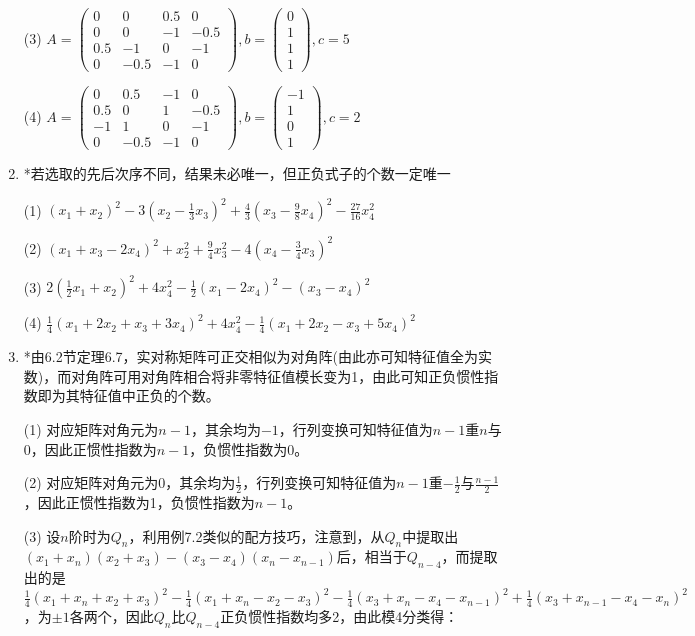 \documentclass[a4paper,UTF8,fontset=windows]{ctexart}
\begin{document}
\begin{enumerate}
(3) $A=\begin{pmatrix}0&0&0.5&0\\0&0&-1&-0.5\\0.5&-1&0&-1\\0&-0.5&-1&0\end{pmatrix},b=\begin{pmatrix}0\\1\\1\\1\end{pmatrix},c=5$

(4) $A=\begin{pmatrix}0&0.5&-1&0\\0.5&0&1&-0.5\\-1&1&0&-1\\0&-0.5&-1&0\end{pmatrix},b=\begin{pmatrix}-1\\1\\0\\1\end{pmatrix},c=2$

\item
*若选取的先后次序不同，结果未必唯一，但正负式子的个数一定唯一

(1) $(x_1+x_2)^2-3\left(x_2-\frac{1}{3}x_3\right)^2+\frac{4}{3}\left(x_3-\frac{9}{8}x_4\right)^2-\frac{27}{16}x_4^2$

(2) $(x_1+x_3-2x_4)^2+x_2^2+\frac{9}{4}x_3^2-4\left(x_4-\frac{3}{4}x_3\right)^2$

(3) $2\left(\frac{1}{2}x_1+x_2\right)^2+4x_4^2-\frac{1}{2}(x_1-2x_4)^2-(x_3-x_4)^2$

(4) $\frac{1}{4}(x_1+2x_2+x_3+3x_4)^2+4x_4^2-\frac{1}{4}(x_1+2x_2-x_3+5x_4)^2$

\item
*由6.2节定理6.7，实对称矩阵可正交相似为对角阵(由此亦可知特征值全为实数)，而对角阵可用对角阵相合将非零特征值模长变为1，由此可知正负惯性指数即为其特征值中正负的个数。

(1) 对应矩阵对角元为$n-1$，其余均为$-1$，行列变换可知特征值为$n-1$重$n$与0，因此正惯性指数为$n-1$，负惯性指数为0。

(2) 对应矩阵对角元为0，其余均为$\frac{1}{2}$，行列变换可知特征值为$n-1$重$-\frac{1}{2}$与$\frac{n-1}{2}$，因此正惯性指数为1，负惯性指数为$n-1$。

(3) 设$n$阶时为$Q_n$，利用例7.2类似的配方技巧，注意到，从$Q_n$中提取出$(x_1+x_n)(x_2+x_3)-(x_3-x_4)(x_n-x_{n-1})$后，相当于$Q_{n-4}$，而提取出的是$\frac{1}{4}(x_1+x_n+x_2+x_3)^2-\frac{1}{4}(x_1+x_n-x_2-x_3)^2-\frac{1}{4}(x_3+x_n-x_4-x_{n-1})^2+\frac{1}{4}(x_3+x_{n-1}-x_4-x_n)^2$，为$\pm1$各两个，因此$Q_n$比$Q_{n-4}$正负惯性指数均多2，由此模4分类得：


\end{enumerate}
\end{document}
